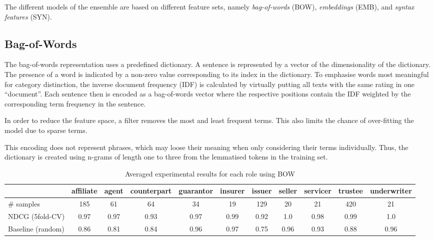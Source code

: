 The different models of the ensemble are based on different feature sets, namely \emph{bag-of-words} (BOW), \emph{embeddings} (EMB), and \emph{syntax features} (SYN).


\subsection{Bag-of-Words}
The bag-of-words representation uses a predefined dictionary.
A sentence is represented by a vector of the dimensionality of the dictionary.
The presence of a word is indicated by a non-zero value corresponding to its index in the dictionary.
To emphasise words most meaningful for category distinction, the inverse document frequency (IDF) is calculated by virtually putting all texts with the same rating in one ``document''. 
Each sentence then is encoded as a bag-of-words vector where the respective positions contain the IDF weighted by the corresponding term frequency in the sentence.

In order to reduce the feature space, a filter removes the most and least frequent terms.
This also limits the chance of over-fitting the model due to sparse terms.

This encoding does not represent phrases, which may loose their meaning when only considering their terms individually.
Thus, the dictionary is created using n-grams of length one to three from the lemmatised tokens in the training set.
\begin{table*}
	\caption{Averaged experimental results for each role using BOW}
	\label{tab:roleresults}
	\begin{tabular}{lcccccccccc}
		\toprule
		& affiliate & agent & counterpart & guarantor & insurer & issuer & seller & servicer & trustee & underwriter \\
		\midrule
               \# samples        & 185  & 61   & 64   & 34   & 19   & 129  & 20   & 21   & 420  & 21   \\
               NDCG (5fold-CV)   & 0.97 & 0.97 & 0.93 & 0.97 & 0.99 & 0.92 & 1.0  & 0.98 & 0.99 & 1.0  \\
               Baseline (random) & 0.86 & 0.81 & 0.84 & 0.96 & 0.97 & 0.75 & 0.96 & 0.93 & 0.88 & 0.96 \\
		\bottomrule
	\end{tabular}
\end{table*}

